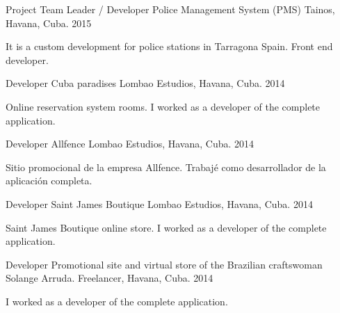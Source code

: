 \begin{cventries}

\cventry
{Project Team Leader / Developer} %
{Police Management System (PMS)} %
{Tainos, Havana, Cuba.} %
{2015} %
{ %
\begin{cvitems}
\item {It is a custom development for police stations in Tarragona Spain. Front end developer.}
\end{cvitems}
}


\cventry
{Developer} %
{Cuba paradises} %
{Lombao Estudios, Havana, Cuba.} %
{2014} %
{ %
\begin{cvitems}
\item {Online reservation system rooms. I worked as a developer of the complete application.}
\end{cvitems}
}


\cventry
{Developer} %
{Allfence} %
{Lombao Estudios, Havana, Cuba.} %
{2014} %
{ %
\begin{cvitems}
\item {Sitio promocional de la empresa Allfence. Trabajé como desarrollador de la aplicación completa.}
\end{cvitems}
}


\cventry
{Developer} %
{Saint James Boutique} %
{Lombao Estudios, Havana, Cuba.} %
{2014} %
{ %
\begin{cvitems}
\item {Saint James Boutique online store. I worked as a developer of the complete application.}
\end{cvitems}
}


\cventry
{Developer} %
{Promotional site and virtual store of the Brazilian craftswoman Solange Arruda.} %
{Freelancer, Havana, Cuba.} %
{2014} %
{ %
\begin{cvitems}
\item {I worked as a developer of the complete application.}
\end{cvitems}
}


\end{cventries}
